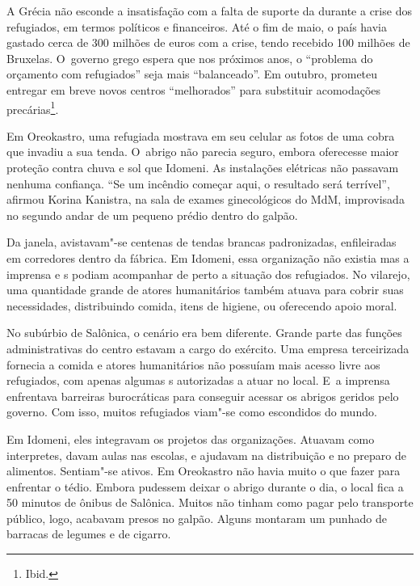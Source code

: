 A Grécia não esconde a insatisfação com a falta de suporte da  durante
a crise dos refugiados, em termos políticos e financeiros. Até o fim de
maio, o país havia gastado cerca de 300 milhões de euros com a crise,
tendo recebido 100 milhões de Bruxelas. O~governo grego espera que nos
próximos anos, o ``problema do orçamento com refugiados'' seja mais
``balanceado''. Em outubro, prometeu entregar em breve novos centros
``melhorados'' para substituir acomodações
precárias\footnote{ Ibid.}.

Em Oreokastro, uma refugiada mostrava em seu celular as fotos de uma
cobra que invadiu a sua tenda. O~abrigo não parecia seguro, embora
oferecesse maior proteção contra chuva e sol que Idomeni. As instalações
elétricas não passavam nenhuma confiança. ``Se um incêndio começar aqui,
o resultado será terrível'', afirmou Korina Kanistra, na sala de exames
ginecológicos do MdM, improvisada no segundo andar de um pequeno prédio
dentro do galpão.

Da janela, avistavam"-se centenas de tendas brancas padronizadas,
enfileiradas em corredores dentro da fábrica. Em Idomeni, essa
organização não existia mas a imprensa e s podiam acompanhar de perto
a situação dos refugiados. No vilarejo, uma quantidade grande de atores
humanitários também atuava para cobrir suas necessidades, distribuindo
comida, itens de higiene, ou oferecendo apoio moral.

No subúrbio de Salônica, o cenário era bem diferente. Grande parte das
funções administrativas do centro estavam a cargo do exército. Uma
empresa terceirizada fornecia a comida e atores humanitários não
possuíam mais acesso livre aos refugiados, com apenas algumas s
autorizadas a atuar no local. E~a imprensa enfrentava barreiras
burocráticas para conseguir acessar os abrigos geridos pelo governo. Com
isso, muitos refugiados viam"-se como escondidos do mundo.

Em Idomeni, eles integravam os projetos das organizações. Atuavam como
interpretes, davam aulas nas escolas, e ajudavam na distribuição e no
preparo de alimentos. Sentiam"-se ativos. Em Oreokastro não havia muito o
que fazer para enfrentar o tédio. Embora pudessem deixar o abrigo
durante o dia, o local fica a 50 minutos de ônibus de Salônica. Muitos
não tinham como pagar pelo transporte público, logo, acabavam presos no
galpão. Alguns montaram um punhado de barracas de legumes e de cigarro.

